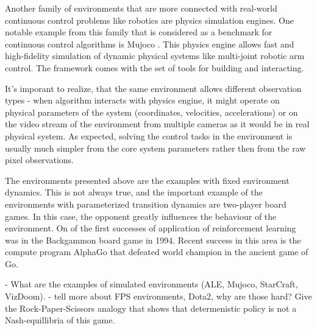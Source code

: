 Another family of environments that are more connected with real-world continuous control
problems like robotics are physics simulation engines. One notable example from this family
that is considered as a benchmark for continuous control algorithms is Mujoco \cite{Mujoco}.
This physics engine allows fast and high-fidelity simulation of dynamic physical systems
like multi-joint robotic arm control. The framework comes with the set of tools for
building and interacting.

It's imporant to realize, that the same environment allows different observation types -
when algorithm interacts with physics engine, it might operate on physical parameters of the
system (coordinates, velocities, accelerations) or on the video stream of the environment from
multiple cameras as it would be in real physical system. As expected, solving the control
tasks in the environment is usually much simpler from the core system parameters rather
then from the raw pixel observations.

The environments presented above are the examples with fixed environment dynamics.
This is not always true, and the important example of the environments with parameterized
transition dynamics are two-player board games. In this case, the opponent greatly influences
the behaviour of the environment. On of the first successes of application of reinforcement
learning was in the Backgammon board game \cite{TDGammon} in 1994.
Recent success in this area is the compute program AlphaGo \cite{AlphaGo} that defeated
world champion in the ancient game of Go.

- What are the examples of simulated environments (ALE, Mujoco, StarCraft, VizDoom).
- tell more about FPS environments, Dota2, why are those hard? Give the Rock-Paper-Scissors
analogy that shows that determenistic policy is not a Nash-equillibria of this game.

